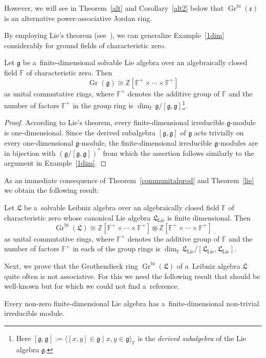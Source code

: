 \documentclass{jonasart}
\DeclareMathOperator{\bi}{bi}
\DeclareMathOperator{\K}{Gr}
\DeclareMathOperator{\lie}{Lie}
\newcommand{\ef}{\mathfrak{e}}
\newcommand{\fbb}{\mathbb{F}}
\newcommand{\gf}{\mathfrak{g}}
\newcommand{\lf}{\mathfrak{L}}
\newcommand{\zbb}{\mathbb{Z}}
\begin{document}
\begin{example}
		{However, we will see in Theorem~\ref{alt} and Corollary~\ref{alt2} below
		that $\K^{\bi}(\ef)$ is an alternative power-associative Jordan ring.}
	\end{example}
	By employing Lie's theorem (see~\cite[Theorem 4.1]{H}), we can generalize
	Example~\ref{1dim} considerably for ground fields of characteristic zero.
	\begin{theorem}\label{lie}
		Let $\gf$ be a~finite-dimensional solvable Lie algebra over an algebraically closed field $\fbb$ of characteristic zero. Then
		\[
			\K(\gf)\cong\zbb[\fbb^+\times\cdots\times\fbb^+ ]
		\]
		as unital commutative rings, where $\fbb^+$ denotes the additive group of $\fbb$ and the number of factors $\fbb^+$ in the group ring is
		$\dim_\fbb\gf/[\gf,\gf]$\footnote{Here $[\gf,\gf]:=\langle [x,y]\in\gf\mid x,y\in\gf\rangle_\fbb$ is the \emph{derived subalgebra\/} of the Lie algebra $\gf$.}.
	\end{theorem}

	\begin{proof}
		According to Lie's theorem, every finite-dimensional irreducible
		$\gf$-module is one-dimensional. Since the derived subalgebra
		$[\gf,\gf]$ of $\gf$ acts trivially on every one-dimensional $\gf$-module, the finite-dimensional irreducible $\gf$-modules are in bijection with
		$(\gf/[\gf,\gf])^*$ from which the assertion follows similarly to the argument in Example~\ref{1dim}.
	\end{proof}

	As an immediate consequence of Theorem~\ref{communitalprod} and Theorem~\ref{lie} we obtain the following result:
	\begin{corollary}\label{solv}
		Let $\lf$ be a~solvable Leibniz algebra over an algebraically closed field $\fbb$
		of characteristic zero whose canonical Lie algebra $\lf_{\lie}$ is finite dimensional. Then
		\[
			\K^{\bi}(\lf)\cong\zbb[\fbb^+\times\cdots\times\fbb^+ ]\circledast\zbb
			[\fbb^+\times\cdots\times\fbb^+ ]
		\]
		as unital commutative rings, where $\fbb^+$ denotes the additive group of $\fbb$ and the number of factors $\fbb^+$ in each of the group rings is
		$\dim_\fbb\lf_{\lie}/[\lf_{\lie},\lf_{\lie}]$.
	\end{corollary}
	Next, we prove that the Grothendieck ring $\K^{\bi}(\lf)$ of a~Leibniz algebra $\lf$
	quite often is not associative. For this we need the following result that should be well-known but for which we could not find a~reference.
	\begin{lemma}\label{nontrivirred}
		Every non-zero finite-dimensional Lie algebra has a~finite-dimensional non-trivial irreducible module.
	\end{lemma}
\end{document}
